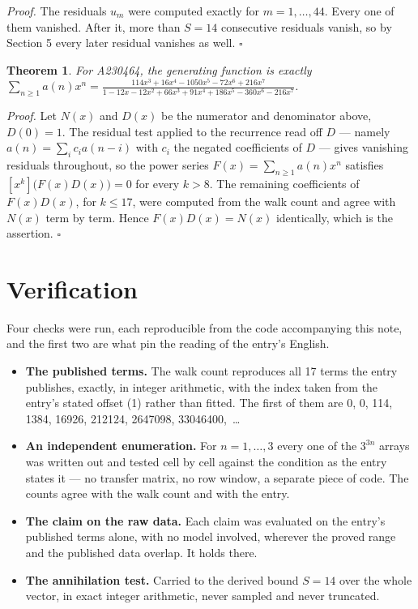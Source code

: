 \documentclass[11pt]{article}
\newtheorem{theorem}{Theorem}
\theoremstyle{definition}
\begin{document}
{\itshape Proof.} The residuals $u_m$ were computed exactly for $m = 1,\dots,44$. Every one of them vanished. After it, more than $S = 14$ consecutive residuals vanish, so by Section 5 every later residual vanishes as well. $\square$

\begin{theorem} For A230464, the generating function is exactly $\sum_{n\ge 1} a(n)x^n = \frac{114x^{3} + 16x^{4} - 1050x^{5} - 72x^{6} + 216x^{7}}{1 - 12x - 12x^{2} + 66x^{3} + 91x^{4} + 186x^{5} - 360x^{6} - 216x^{7}}$.\end{theorem}

{\itshape Proof.} Let $N(x)$ and $D(x)$ be the numerator and denominator above, $D(0)=1$. The residual test applied to the recurrence read off $D$ --- namely $a(n) = \sum_i c_i a(n-i)$ with $c_i$ the negated coefficients of $D$ --- gives vanishing residuals throughout, so the power series $F(x)=\sum_{n\ge 1}a(n)x^n$ satisfies $[x^k]\bigl(F(x)D(x)\bigr) = 0$ for every $k > 8$. The remaining coefficients of $F(x)D(x)$, for $k \le 17$, were computed from the walk count and agree with $N(x)$ term by term. Hence $F(x)D(x) = N(x)$ identically, which is the assertion. $\square$

\section{Verification}

Four checks were run, each reproducible from the code accompanying this note, and the first two are what pin the reading of the entry's English.

\begin{itemize}

\item {\bfseries The published terms.} The walk count reproduces all 17 terms the entry publishes, exactly, in integer arithmetic, with the index taken from the entry's stated offset (1) rather than fitted. The first of them are 0, 0, 114, 1384, 16926, 212124, 2647098, 33046400,~\dots

\item {\bfseries An independent enumeration.} For $n = 1,\dots,3$ every one of the $3^{3n}$ arrays was written out and tested cell by cell against the condition as the entry states it --- no transfer matrix, no row window, a separate piece of code. The counts agree with the walk count and with the entry.

\item {\bfseries The claim on the raw data.} Each claim was evaluated on the entry's published terms alone, with no model involved, wherever the proved range and the published data overlap. It holds there.

\item {\bfseries The annihilation test.} Carried to the derived bound $S = 14$ over the whole vector, in exact integer arithmetic, never sampled and never truncated.

\end{itemize}
\end{document}
